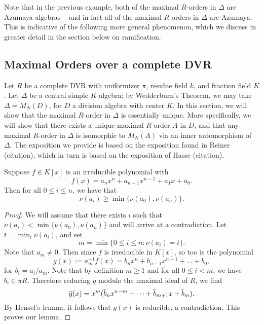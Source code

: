 Note that in the previous example, both of the maximal $R$-orders in $\Delta$ are Azumaya algebras -- and in fact all of the maximal $R$-orders in $\Delta$ are Azumaya.  This is indicative of the following more general phenomenon, which we discuss in greater detail in the section below on ramification.

\subsection{Maximal Orders over a complete DVR}
Let $R$ be a complete DVR with uniformizer $\pi$, residue field $k$, and fraction field $K$.  Let $\Delta$ be a central simple $K$-algebra; by Wedderburn's Theorem, we may take $\Delta = M_N(D)$, for $D$ a division algebra with center $K$.  In this section, we will show that the maximal $R$-order in $\Delta$ is essentially unique.  More specifically, we will show that there exists a unique maximal $R$-order $A$ in $D$, and that any maximal $R$-order in $\Delta$ is isomorphic to $M_N(A)$ via an inner automorphism of $\Delta$.  The exposition we provide is based on the exposition found in Reiner (citation), which in turn is based on the exposition of Hasse (citation).

\begin{lem}
Suppose $f\in K[x]$ is an irreducible polynomial with
$$f(x) = a_nx^n + a_{n-1}x^{n-1} + a_1x + a_0.$$
Then for all $0\leq i\leq n$, we have that
$$\nu(a_i)\geq \min\{\nu(a_0),\nu(a_n)\}.$$
\end{lem}
\begin{proof}
We will assume that there exists $i$ such that $\nu(a_i) <\min\{\nu(a_0),\nu(a_n)\}$ and will arrive at a contradiction.  Let $t = \min_i \nu(a_i)$, and set
$$m = \min\{0\leq i\leq n: \nu(a_i) = t\}.$$
Note that $a_m\neq 0$.  Then since $f$ is irreducible in $K[x]$, so too is the polynomial
$$g(x) := a_m^{-1}f(x) = b_nx^n + b_{n-1}x^{n-1} + \dots + b_0,$$
for $b_i = a_i/a_m$.  Note that by definition $m\geq 1$ and for all $0\leq i<m$, we have $b_i\in \pi R$.  Therefore reducing $g$ modulo the maximal ideal of $R$, we find
$$\overline{g}(x) = x^m(\overline{b}_nx^{n-m} + \dots + \overline{b}_{m+1}x + \overline{b}_{m}).$$
By Hensel's lemma, it follows that $g(x)$ is reducible, a contradiction.  This proves our lemma.
\end{proof}

